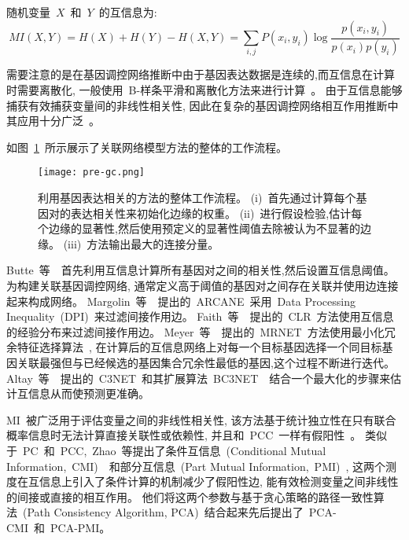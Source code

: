 随机变量~$X$~和~$Y$~的互信息为:
\begin{equation}
MI(X,Y) = H(X) + H(Y) - H(X,Y) = \sum\limits_{i,j} {P(x_i ,y_i )\log \frac{{p(x_i,y_i )}}{{p(x_i )p(y_i )}}} 
\end{equation}

需要注意的是在基因调控网络推断中由于基因表达数据是连续的,而互信息在计算时需要离散化,
一般使用~B-样条平滑和离散化方法来进行计算~\cite{daub2004estimating}。
由于互信息能够捕获有效捕获变量间的非线性相关性,
因此在复杂的基因调控网络相互作用推断中其应用十分广泛~\cite{brunel2010miss,zhang2011inferring}。

如图~\ref{fig:pre-gc}~所示展示了关联网络模型方法的整体的工作流程。
\begin{figure}[!htbp]
    \centering
    \texttt{[image: pre-gc.png]}
    \caption{
        利用基因表达相关的方法的整体工作流程。
        (i)~首先通过计算每个基因对的表达相关性来初始化边缘的权重。
        (ii)~进行假设检验,估计每个边缘的显著性,然后使用预定义的显著性阈值去除被认为不显著的边缘。
        (iii)~方法输出最大的连接分量。
    }
    \label{fig:pre-gc}
\end{figure}


Butte~等~\cite{basso2005reverse}~首先利用互信息计算所有基因对之间的相关性,然后设置互信息阈值。
为构建关联基因调控网络, 通常定义高于阈值的基因对之间存在关联并使用边连接起来构成网络。
Margolin~等~\cite{margolin2006aracne}~提出的~ARCANE~采用~Data Processing Inequality~(DPI)~来过滤间接作用边。
Faith~等~\cite{faith2007large}~提出的~CLR~方法使用互信息的经验分布来过滤间接作用边。
Meyer~等~\cite{meyer2007information}~提出的~MRNET~方法使用最小化冗余特征选择算法~\cite{peng2005feature},
在计算后的互信息网络上对每一个目标基因选择一个同目标基因关联最强但与已经候选的基因集合冗余性最低的基因,这个过程不断进行迭代。
Altay~等~\cite{altay2010inferring}~提出的~C3NET~和其扩展算法~BC3NET~\cite{de2012bagging}~结合一个最大化的步骤来估计互信息从而使预测更准确。

MI~被广泛用于评估变量之间的非线性相关性,
该方法基于统计独立性在只有联合概率信息时无法计算直接关联性或依赖性,
并且和~PCC~一样有假阳性~\cite{frenzel2007partial,schreiber2000measuring}。
类似于~PC~和~PCC,~Zhao~等提出了条件互信息~(Conditional Mutual Information,~CMI)~\cite{zhang2011inferring}~和部分互信息~(Part Mutual Information,~PMI)~\cite{zhao2016part},
这两个测度在互信息上引入了条件计算的机制减少了假阳性边,
能有效检测变量之间非线性的间接或直接的相互作用。
他们将这两个参数与基于贪心策略的路径一致性算法~(Path Consistency Algorithm, PCA)~结合起来先后提出了~PCA-CMI\cite{zhang2011inferring}~和~PCA-PMI\cite{zhao2016part}。

